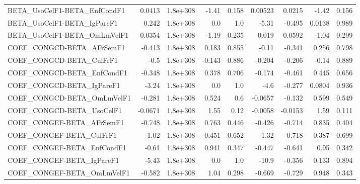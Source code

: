 \begin{tabular}{lrrrrrrrr}
BETA\_UsoCelF1-BETA\_EnfCondF1          &      0.0413 &     1.8e+308 &   -1.41 &    0.158 &    0.00523 &      0.0215 &        -1.42 &         0.156 \\
BETA\_UsoCelF1-BETA\_IgPareF1           &       0.242 &     1.8e+308 &     0.0 &      1.0 &      -5.31 &      -0.495 &       0.0138 &         0.989 \\
BETA\_UsoCelF1-BETA\_OmLmVelF1          &      0.0354 &     1.8e+308 &   -1.19 &    0.235 &      0.019 &      0.0592 &        -1.04 &         0.299 \\
COEF\_CONGCD-BETA\_AFrSemF1             &      -0.413 &     1.8e+308 &   0.183 &    0.855 &      -0.11 &      -0.341 &        0.256 &         0.798 \\
COEF\_CONGCD-BETA\_CulFrF1              &        -0.5 &     1.8e+308 &  -0.143 &    0.886 &     -0.204 &      -0.206 &        -0.14 &         0.889 \\
COEF\_CONGCD-BETA\_EnfCondF1            &      -0.348 &     1.8e+308 &   0.378 &    0.706 &     -0.174 &      -0.461 &        0.445 &         0.656 \\
COEF\_CONGCD-BETA\_IgPareF1             &       -3.24 &     1.8e+308 &     0.0 &      1.0 &       -4.6 &      -0.277 &       0.0804 &         0.936 \\
COEF\_CONGCD-BETA\_OmLmVelF1            &      -0.281 &     1.8e+308 &   0.524 &      0.6 &    -0.0657 &      -0.132 &        0.599 &         0.549 \\
COEF\_CONGCD-BETA\_UsoCelF1             &     -0.0671 &     1.8e+308 &    1.55 &     0.12 &    -0.0058 &     -0.0153 &         1.59 &         0.111 \\
COEF\_CONGEF-BETA\_AFrSemF1             &      -0.748 &     1.8e+308 &   0.763 &    0.446 &     -0.426 &      -0.714 &        0.835 &         0.404 \\
COEF\_CONGEF-BETA\_CulFrF1              &       -1.02 &     1.8e+308 &   0.451 &    0.652 &      -1.32 &      -0.718 &        0.387 &         0.699 \\
COEF\_CONGEF-BETA\_EnfCondF1            &       -0.61 &     1.8e+308 &   0.941 &    0.347 &     -0.447 &      -0.641 &         0.95 &         0.342 \\
COEF\_CONGEF-BETA\_IgPareF1             &       -5.43 &     1.8e+308 &     0.0 &      1.0 &      -10.9 &      -0.356 &        0.133 &         0.894 \\
COEF\_CONGEF-BETA\_OmLmVelF1            &      -0.582 &     1.8e+308 &    1.04 &    0.298 &     -0.669 &      -0.729 &        0.948 &         0.343 \\

\end{tabular}

